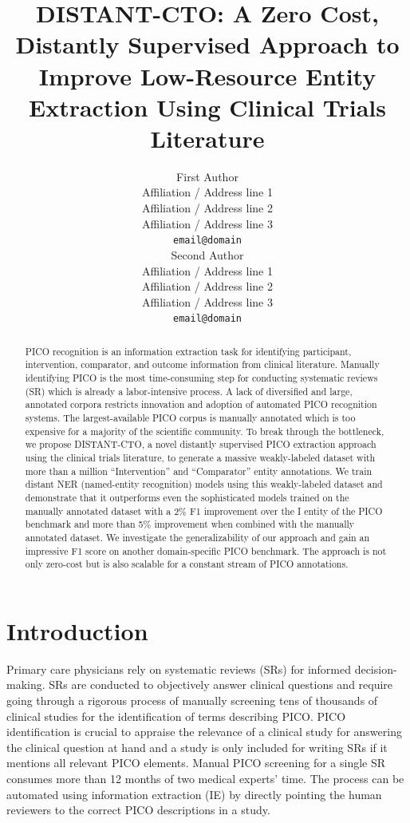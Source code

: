 \documentclass[11pt]{article}
\title{DISTANT-CTO: A Zero Cost, Distantly Supervised Approach to Improve Low-Resource Entity Extraction Using Clinical Trials Literature}
\author{First Author \\
  Affiliation / Address line 1 \\
  Affiliation / Address line 2 \\
  Affiliation / Address line 3 \\
  \texttt{email@domain} \\\And
  Second Author \\
  Affiliation / Address line 1 \\
  Affiliation / Address line 2 \\
  Affiliation / Address line 3 \\
  \texttt{email@domain} \\}
\begin{document}
\maketitle
\begin{abstract}
PICO recognition is an information extraction task for identifying participant, intervention, comparator, and outcome information from clinical literature.
Manually identifying PICO is the most time-consuming step for conducting systematic reviews (SR) which is already a labor-intensive process.
A lack of diversified and large, annotated corpora restricts innovation and adoption of automated PICO recognition systems.
The largest-available PICO corpus is manually annotated which is too expensive for a majority of the scientific community.
To break through the bottleneck, we propose DISTANT-CTO, a novel distantly supervised PICO extraction approach using the clinical trials literature, to generate a massive weakly-labeled dataset with more than a million ``Intervention'' and ``Comparator'' entity annotations.
We train distant NER (named-entity recognition) models using this weakly-labeled dataset and demonstrate that it outperforms even the sophisticated models trained on the manually annotated dataset with a 2\% F1 improvement over the I entity of the PICO benchmark and more than 5\% improvement when combined with the manually annotated dataset.
We investigate the generalizability of our approach and gain an impressive F1 score on another domain-specific PICO benchmark.
The approach is not only zero-cost but is also scalable for a constant stream of PICO annotations.
\end{abstract}
%
\section{Introduction}
\label{sec:intro}
%
Primary care physicians rely on systematic reviews (SRs) for informed decision-making.
SRs are conducted to objectively answer clinical questions and require going through a rigorous process of manually screening tens of thousands of clinical studies for the identification of terms describing PICO.
PICO identification is crucial to appraise the relevance of a clinical study for answering the clinical question at hand and a study is only included for writing SRs if it mentions all relevant PICO elements.
Manual PICO screening for a single SR consumes more than 12 months of two medical experts' time.
The process can be automated using information extraction (IE) by directly pointing the human reviewers to the correct PICO descriptions in a study.
\end{document}
